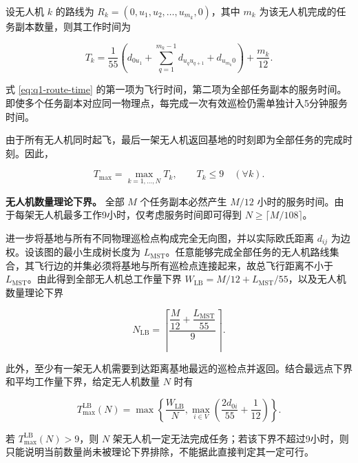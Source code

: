 \documentclass[UTF8,a4paper,12pt]{ctexart}
\numberwithin{equation}{section}
\numberwithin{equation}{section}
\begin{document}
设无人机 \(k\) 的路线为
\(R_k=(0,u_1,u_2,\ldots,u_{m_k},0)\)，其中 \(m_k\) 为该无人机完成的任务副本数量，则其工作时间为

\begin{equation}
  T_k=
  \frac{1}{55}
  \left(
  d_{0u_1}
  +\sum_{q=1}^{m_k-1}d_{u_q u_{q+1}}
  +d_{u_{m_k}0}
  \right)
  +\frac{m_k}{12}.
  \label{eq:q1-route-time}
\end{equation}

式 \eqref{eq:q1-route-time} 的第一项为飞行时间，第二项为全部任务副本的服务时间。即使多个任务副本对应同一物理点，每完成一次有效巡检仍需单独计入5分钟服务时间。

由于所有无人机同时起飞，最后一架无人机返回基地的时刻即为全部任务的完成时刻。因此，

\begin{equation}
  T_{\max}=\max_{k=1,\ldots,N}T_k,
  \qquad
  T_k\leq9\quad(\forall k).
  \label{eq:q1-makespan}
\end{equation}

\noindent\textbf{无人机数量理论下界。}
全部 \(M\) 个任务副本必然产生 \(M/12\) 小时的服务时间。由于每架无人机最多工作9小时，仅考虑服务时间即可得到
\(N\geq\lceil M/108\rceil\)。

进一步将基地与所有不同物理巡检点构成完全无向图，并以实际欧氏距离 \(d_{ij}\) 为边权。设该图的最小生成树长度为 \(L_{\mathrm{MST}}\)。任意能够完成全部任务的无人机路线集合，其飞行边的并集必须将基地与所有巡检点连接起来，故总飞行距离不小于 \(L_{\mathrm{MST}}\)。由此得到全部无人机总工作量下界
\(W_{\mathrm{LB}}=M/12+L_{\mathrm{MST}}/55\)，以及无人机数量理论下界

\begin{equation}
  N_{\mathrm{LB}}
  =
  \left\lceil
  \frac{
  \dfrac{M}{12}
  +
  \dfrac{L_{\mathrm{MST}}}{55}
  }{9}
  \right\rceil.
  \label{eq:q1-drone-lower-bound}
\end{equation}

此外，至少有一架无人机需要到达距离基地最远的巡检点并返回。结合最远点下界和平均工作量下界，给定无人机数量 \(N\) 时有

\begin{equation}
  T_{\max}^{\mathrm{LB}}(N)
  =
  \max
  \left\{
  \frac{W_{\mathrm{LB}}}{N},
  \max_{i\in V}
  \left(
  \frac{2d_{0i}}{55}+\frac{1}{12}
  \right)
  \right\}.
  \label{eq:q1-tmax-lower-bound}
\end{equation}

若 \(T_{\max}^{\mathrm{LB}}(N)>9\)，则 \(N\) 架无人机一定无法完成任务；若该下界不超过9小时，则只能说明当前数量尚未被理论下界排除，不能据此直接判定其一定可行。
\end{document}
